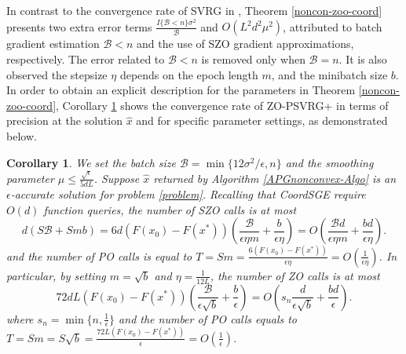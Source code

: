 \documentclass{article}
\newtheorem{corollary}[theorem]{Corollary}
\theoremstyle{definition}
\theoremstyle{remark}
\begin{document}
In contrast to the convergence rate of SVRG in \cite{reddi2016proximal}, Theorem \ref{noncon-zoo-coord} presents two
extra error terms $\frac{I\{\mathcal{B} < n\}\sigma ^2}{\mathcal{B}}$ and $O(L^2d^2\mu^2)$, attributed to batch gradient estimation $\mathcal{B} < n$ and the use of SZO gradient approximations, respectively. The error related to $\mathcal{B} < n$ is removed only when $\mathcal{B} = n$. 
It is also observed the stepsize  $\eta$ depends on the epoch length $m$, and the minibatch size $b$. In order to obtain an explicit description for the  parameters in Theorem \ref{noncon-zoo-coord}, Corollary \ref{corr11} shows the convergence rate of ZO-PSVRG+ in terms of precision at the solution $\hat{x}$ and  for specific parameter settings, as demonstrated below.


 \begin{corollary}\label{corr11}
We set the batch size $\mathcal{B} = \min\{12\sigma^2/\epsilon, n\}$ and the smoothing parameter $\mu \leq \frac{\sqrt{\epsilon}}{5{dL}}$. Suppose $\hat{x}$ returned by Algorithm \ref{APGnonconvex-Algo}  is an $\epsilon$-accurate solution for problem \eqref{problem}. Recalling that CoordSGE require $O(d)$ function queries, the number of SZO calls is at most 
\begin{equation}\label{SZO-call-nocon}
d(S\mathcal{B}+Smb) = 6d \left(F(x_0) - F({x}^*)\right) (\frac{\mathcal{B}}{\epsilon\eta m}+\frac{b}{\epsilon\eta}) = O\left(\frac{\mathcal{B}d}{\epsilon\eta m}+\frac{bd}{\epsilon\eta}\right).
\end{equation} 
and the number of PO calls is equal to $T = Sm = \frac{6\left(F(x_0) - F({x}^*)\right)}{\epsilon\eta} = O\left(\frac{1}{\epsilon\eta}\right)$. In particular, by setting $m=\sqrt{b}$ and $\eta = \frac{1}{12L}$, the number of ZO calls is at most 
\begin{equation}\label{SZO-call-par-nocon}
72d L (F(x_0)-F(x^*))\left(\frac{\mathcal{B}}{\epsilon\sqrt{b}}+\frac{b}{\epsilon}\right) = O\left(s_n\frac{d}{\epsilon \sqrt{b}}+\frac{bd}{\epsilon}\right).
\end{equation}
where $s_n = \min\{n,\frac{1}{\epsilon}\}$ and the number of PO calls equals to $T = Sm = S\sqrt{b} = \frac{72 L \left(F(x_0) - F({x}^*)\right)}{\epsilon} = O\left(\frac{1}{\epsilon}\right)$. 
\end{corollary}
\end{document}
